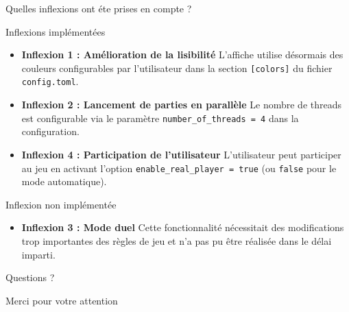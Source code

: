 \documentclass[10pt,french]{beamer}
\begin{document}
\begin{frame}{Quelles inflexions ont éte prises en compte ?}
    \begin{exampleblock}{Inflexions implémentées}
        \begin{itemize}
            \item \textbf{Inflexion 1 : Amélioration de la lisibilité} L'affiche utilise désormais des couleurs configurables par l'utilisateur dans la section \texttt{[colors]} du fichier \texttt{config.toml}.
            \item \textbf{Inflexion 2 : Lancement de parties en parallèle} Le nombre de threads est configurable via le paramètre \texttt{number\_of\_threads = 4} dans la configuration.
            \item \textbf{Inflexion 4 : Participation de l'utilisateur} L'utilisateur peut participer au jeu en activant l'option \texttt{enable\_real\_player = true} (ou \texttt{false} pour le mode automatique).
        \end{itemize}
    \end{exampleblock}

    \begin{alertblock}{Inflexion non implémentée}
        \begin{itemize}
            \item \textbf{Inflexion 3 : Mode duel} Cette fonctionnalité nécessitait des modifications trop importantes des règles de jeu et n'a pas pu être réalisée dans le délai imparti.
        \end{itemize}
    \end{alertblock}
\end{frame}

\begin{frame}[standout]
    \centering
    \Huge{Questions ?}

    \vspace{1cm}
    \large{Merci pour votre attention}
\end{frame}
\end{document}
